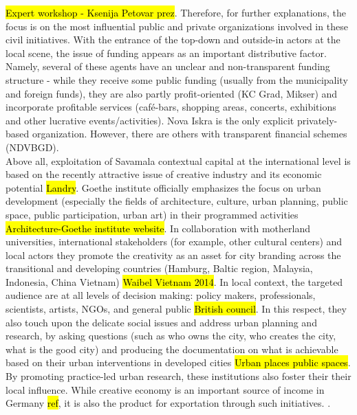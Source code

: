 \documentclass[11pt]{report}
\begin{document}
\hl{Expert workshop - Ksenija Petovar prez}.
Therefore, for further explanations, the focus is on the most influential public and private organizations involved in these civil initiatives.
With the entrance of the top-down and outside-in actors at the local scene, the issue of funding appears as an important distributive factor.
Namely, several of these agents have an unclear and non-transparent funding structure - while they receive some public funding (usually from the municipality and foreign funds), they are also partly profit-oriented (KC Grad, Mikser) and incorporate profitable services (café-bars, shopping areas, concerts, exhibitions and other lucrative events/activities).
Nova Iskra is the only explicit privately-based organization.
However, there are others with transparent financial schemes (NDVBGD).
\\
Above all, exploitation of Savamala contextual capital at the international level is based on the recently attractive issue of creative industry and its economic potential \hl{Landry}.
Goethe institute officially emphasizes the focus on urban development (especially the fields of architecture, culture, urban planning, public space, public participation, urban art) in their programmed activities \hl{Architecture-Goethe institute website}.
In collaboration with motherland universities, international stakeholders (for example, other cultural centers) and local actors they promote the creativity as an asset for city branding across the transitional and developing countries (Hamburg, Baltic region, Malaysia, Indonesia, China Vietnam) \hl{Waibel Vietnam 2014}.
In local context, the targeted audience are at all levels of decision making: policy makers, professionals, scientists, artists, NGOs, and general public \hl{British council}.
In this respect, they also touch upon the delicate social issues and address urban planning and research, by asking questions (such as who owns the city, who creates the city, what is the good city) and producing the documentation on what is achievable based on their urban interventions in developed cities \hl{Urban places public spaces}.
By promoting practice-led urban research, these institutions also foster their their local influence.
While creative economy is an important source of income in Germany \hl{ref}, it is also the product for exportation through such initiatives. \footnotemark.
\end{document}
